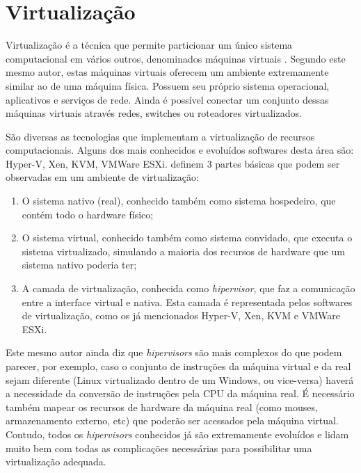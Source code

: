 \section{Virtualização}

Virtualização é a técnica que permite particionar um único sistema computacional em
vários outros, denominados máquinas virtuais \cite{virt-teoria-solucoes}. Segundo
este mesmo autor, estas máquinas virtuais oferecem um ambiente extremamente similar ao de uma máquina física.
Possuem seu próprio sistema operacional, aplicativos e serviços de rede. Ainda é possível
conectar um conjunto dessas máquinas virtuais através redes, switches ou roteadores virtualizados.

São diversas as tecnologias que implementam a virtualização de recursos computacionais.
Alguns dos mais conhecidos e evoluídos softwares desta área são: Hyper-V, Xen, KVM,
VMWare ESXi.  definem 3 partes básicas que podem ser
observadas em um ambiente de virtualização:

\begin{enumerate}
    \item
        O sistema nativo (real), conhecido também como sistema hospedeiro, que contém todo o hardware
        físico;

    \item
        O sistema virtual, conhecido também como sistema convidado, que executa o sistema virtualizado,
        simulando a maioria dos recursos de hardware que um sistema nativo poderia ter;

    \item
        A camada de virtualização, conhecida como \textit{hipervisor}, que faz a comunicação entre a
        interface virtual e nativa. Esta camada é representada pelos softwares de virtualização, como
        os já mencionados Hyper-V, Xen, KVM e VMWare ESXi.
\end{enumerate}

Este mesmo autor ainda diz que \emph{hipervisors} são mais complexos do que podem
parecer, por exemplo, caso o conjunto de instruções da máquina virtual e da real
sejam diferente (Linux virtualizado dentro de um Windows, ou vice-versa) haverá
a necessidade da conversão de instruções pela CPU da máquina real. É necessário
também mapear os recursos de hardware da máquina real (como mouses,
armazenamento externo, etc) que poderão ser acessados pela máquina virtual. Contudo,
todos os \emph{hipervisors} conhecidos já são extremamente evoluídos e lidam
muito bem com todas as complicações necessárias para possibilitar uma virtualização
adequada.

